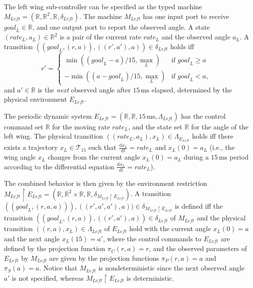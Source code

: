 \documentclass{sig-alternate}
\begin{document}
The left wing sub-controller  can be specified 
as the typed machine 
$M_\mathit{Left} = (\mathbb{R}, \mathbb{R}^2, \mathbb{R}, \delta_{\mathit{Left}})$.
The machine $M_\mathit{Left}$ has one input port to receive $\mathit{goal}_L \in \mathbb{R}$,
and one output port to report the observed angle. %
A state $(\mathit{rate}_L, a_L) \in \mathbb{R}^2$ is a pair of the current rate $\mathit{rate}_L$ and the observed angle $a_L$.
A transition $((\mathit{goal}_L, (r, a)), ((r', a'),a)) \in  \delta_{\mathit{Left}}$
holds iff 
\[
r' = 
\begin{cases}
\min((\mathit{goal}_L - a) / 15, \max_L)  & \mbox{if } \mathit{goal}_L \geq a
\\
- \min((a - \mathit{goal}_L) / 15, \max_L) & \mbox{if } \mathit{goal}_L < a,
\end{cases}
\]
and $a' \in \mathbb{R}$ is the \emph{next}  observed angle after $15\,\mathrm{ms}$ elapsed,
determined by the physical environment $E_\mathit{Left}$.

The periodic dynamic system 
$E_\mathit{Left} = (\mathbb{R}, \mathbb{R}, 15\,\mathrm{ms}, \Lambda_\mathit{Left})$
has the control command set $\mathbb{R}$ for the moving rate $\mathit{rate}_L$,
and the state set $\mathbb{R}$ for the angle of the left wing.
The physical transition 
$( (\mathit{rate}_L, a_L), x_L ) \in \Lambda_{E_\mathit{Left}}$ holds
iff there exists a trajectory $x_L \in \mathcal{T}_{15}$ such that
$\frac{\mathrm{d} x_L}{\mathrm{d}t} = \mathit{rate}_L$ and $x_L(0) = a_L$
(i.e., the wing angle  $x_L$ changes from the current angle $x_L(0) = a_L$
during a $15\,\mathrm{ms}$ period according to the differential 
equation $\frac{\mathrm{d} x_L}{\mathrm{d}t} = \mathit{rate}_L$).

The combined behavior is then given by the environment restriction 
$M_\mathit{Left} \restriction E_\mathit{Left} = (\mathbb{R}, \mathbb{R}^2 \times \mathbb{R}, \mathbb{R}, \delta_{M_\mathit{Left} \restriction E_\mathit{Left}})$.
A transition 
$((\mathit{goal}_L, (r, a, a))), ((r',a', a'), a) ) 
\in \delta_{M_\mathit{Left} \restriction E_\mathit{Left}}$ 
is defined iff
the transition $( (\mathit{goal}_L, (r,a)), ((r',a'),a) ) \in \delta_{\mathit{Left}}$
of $M_\mathit{Left}$
and the physical transition 
$((r, a), x_L) \in \Lambda_{\mathit{Left}}$ of $E_\mathit{Left}$ hold
with the current angle $x_L(0) = a$ and the next angle $x_L(15) = a'$,
where the control commands to $E_\mathit{Left}$ are defined by the projection function $\pi_C(r,a) = r$,
and the observed parameters of $E_\mathit{Left}$ by $M_\mathit{Left}$
are given by the projection functions $\pi_P(r,a) = a$ and $\pi_S(a) = a$.
Notice that $M_\mathit{Left}$ is nondeterministic
since the next observed angle $a'$ is not specified,
whereas
$M_\mathit{Left} \restriction E_\mathit{Left}$ is deterministic.
\end{document}
